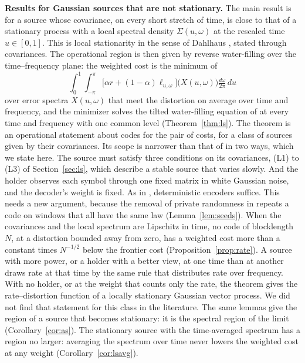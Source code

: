 \documentclass[11pt,onecolumn]{IEEEtran}
\newcommand{\dw}{\tfrac{d\omega}{2\pi}}
\begin{document}
\textbf{Results for Gaussian sources that are not stationary.} The
main result is for a source whose covariance, on every short stretch
of time, is close to that of a stationary process with a local
spectral density $\Sigma(u,\omega)$ at the rescaled time $u\in[0,1]$.
This is local stationarity in the sense of Dahlhaus
\cite{dahlhaus1996}, stated through covariances. The operational
region is then given by reverse water-filling over the
time--frequency plane: the weighted cost is the minimum of
\[
\int_0^1\!\!\int_{-\pi}^{\pi}\bigl[\alpha r+(1-\alpha)\ell_{u,\omega}\bigr]\bigl(X(u,\omega)\bigr)\dw\,du
\]
over error spectra $X(u,\omega)$ that meet the distortion on average
over time and frequency, and the minimizer solves the tilted
water-filling equation of \cite{part2} at every time and frequency
with one common level (Theorem~\ref{thm:ls}). The theorem is an
operational statement about codes for the pair of costs, for a class
of sources given by their covariances. Its scope is narrower than that
of \cite{part2} in two ways, which we state here. The source must
satisfy three conditions on its covariances, (L1) to (L3) of
Section~\ref{sec:ls}, which describe a stable source that varies
slowly. And the holder observes each symbol through one fixed matrix in
white Gaussian noise, and the decoder's weight is fixed. As in
\cite{part1,part2}, deterministic encoders suffice. This needs a new
argument, because the removal of private randomness in \cite{part2}
repeats a code on windows that all have the same law
(Lemma~\ref{lem:seeds}). When the covariances and the local spectrum
are Lipschitz in time, no code of blocklength $N$, at a distortion
bounded away from zero, has a weighted cost more than a constant times
$N^{-1/2}$ below the frontier cost (Proposition~\ref{prop:rate}).
A source with more
power, or a holder with a better view, at one time than at another
draws rate at that time by the same rule that distributes rate over
frequency. With no holder, or at the weight that counts only the
rate, the theorem gives the rate--distortion function of a locally
stationary Gaussian vector process. We did not find that statement
for this class in the literature. The same lemmas give the region of
a source that becomes stationary: it is the spectral region of the
limit (Corollary~\ref{cor:as}). The stationary source with the
time-averaged spectrum has a region no larger: averaging the spectrum
over time never lowers the weighted cost at any weight
(Corollary~\ref{cor:lsavg}).
\end{document}
